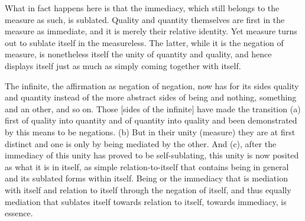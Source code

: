 What in fact happens here is that the immediacy,
which still belongs to the measure as such, is sublated.
Quality and quantity themselves are first
in the measure as immediate,
and it is merely their relative identity.
Yet measure turns out to sublate itself in the measureless.
The latter, while it is the negation of measure, is
nonetheless itself the unity of quantity and quality,
and hence displays itself just as much as
simply coming together with itself.

The infinite, the affirmation as negation of negation,
now has for its sides quality and quantity instead of
the more abstract sides of being and nothing,
something and an other, and so on.
Those [sides of the infinite] have made the transition
(a) first of quality into quantity and
of quantity into quality and been demonstrated
by this means to be negations.
(b) But in their unity (measure) they are at first distinct and
one is only by being mediated by the other.
And (c), after the immediacy of this unity
has proved to be self-sublating,
this unity is now posited as what it is in itself,
as simple relation-to-itself that contains
being in general and its sublated forms within itself.
Being or the immediacy that is mediation with itself and
relation to itself through the negation of itself, and
thus equally mediation that sublates itself
towards relation to itself,
towards immediacy, is essence.
